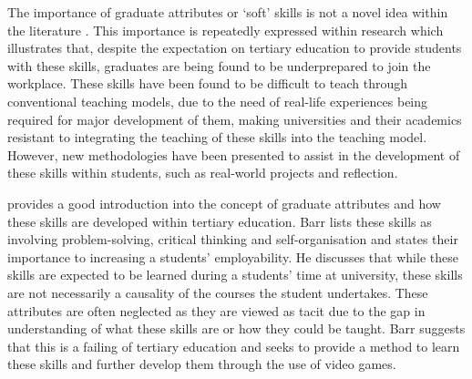 \documentclass{l4proj}
\begin{document}
The importance of graduate attributes or ‘soft' skills is not a novel idea 
within the literature \citep{barr_2019}. This importance is repeatedly expressed within research which illustrates 
that, despite the expectation on tertiary education to provide students with these skills, graduates 
are being found to be underprepared to join the workplace. These skills have been found to be 
difficult to teach through conventional teaching models, due to the need of real-life experiences 
being required for major development of them, making universities and their academics resistant to 
integrating the teaching of these skills into the teaching model. However, new methodologies have 
been presented to assist in the development of these skills within students, such as real-world 
projects and reflection.
\par  
\citet{barr_2019} provides a good introduction into the concept of graduate attributes and 
how these skills are developed within tertiary education. Barr lists these skills as involving 
problem-solving, critical thinking and self-organisation and states their importance to increasing 
a students’ employability. He discusses that while these skills are expected to be learned during a 
students’ time at university, these skills are not necessarily a causality of the courses the student 
undertakes. These attributes are often neglected as they are viewed as tacit due to the gap in 
understanding of what these skills are or how they could be taught. Barr suggests that this is a 
failing of tertiary education and seeks to provide a method to learn these skills and further develop 
them through the use of video games. 
\end{document}
